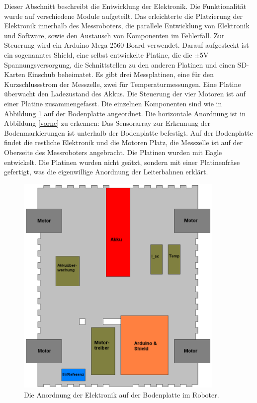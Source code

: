 \documentclass[a4paper,bibtotoc,oneside]{scrbook}
\begin{document}
Dieser Abschnitt beschreibt die Entwicklung der Elektronik. Die Funktionalität wurde auf verschiedene Module aufgeteilt. Das erleichterte die Platzierung der Elektronik innerhalb des Messroboters, die parallele Entwicklung von Elektronik und Software, sowie den Austausch von Komponenten im Fehlerfall. 
Zur Steuerung wird ein Arduino Mega 2560 Board verwendet. Darauf aufgesteckt ist ein sogenanntes Shield, eine selbst entwickelte Platine, die die $\pm$5V Spannungsversorgung, die Schnittstellen zu den anderen Platinen und einen SD-Karten Einschub beheimatet.
Es gibt drei Messplatinen, eine für den Kurzschlussstrom der Messzelle, zwei für Temperaturmessungen. Eine Platine überwacht den Ladezustand des Akkus. Die Steuerung der vier Motoren ist auf einer Platine zusammengefasst.
Die einzelnen Komponenten sind wie in Abbildung \ref{elek} auf der Bodenplatte angeordnet.
Die horizontale Anordnung ist in Abbildung \ref{vorne} zu erkennen: Das Sensorarray zur Erkennung der Bodenmarkierungen ist unterhalb der Bodenplatte befestigt. Auf der Bodenplatte findet die restliche Elektronik und die Motoren Platz, die Messzelle ist auf der Oberseite des Messroboters angebracht.
Die Platinen wurden mit Eagle entwickelt. Die Platinen wurden nicht geätzt, sondern mit einer Platinenfräse gefertigt, was die eigenwillige Anordnung der Leiterbahnen erklärt. 
\begin{figure}[htbp]
\centering
\includegraphics[width=100mm]{img/bodenplatte.png}
\caption{Die Anordnung der Elektronik auf der Bodenplatte im Roboter.}\label{elek}
\end{figure}
 
\end{document}

